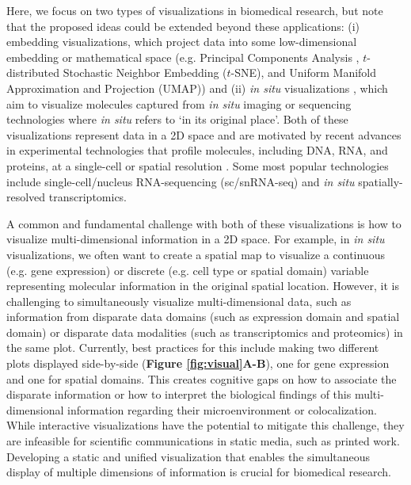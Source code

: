 \documentclass[10pt,twocolumn]{article}
\begin{document}
Here, we focus on two types of visualizations in biomedical research, but note that the proposed ideas could be extended beyond these applications: (i) embedding visualizations, which project data into some low-dimensional embedding or mathematical space (e.g. Principal Components Analysis , $t$-distributed Stochastic Neighbor Embedding ($t$-SNE), and Uniform Manifold Approximation and Projection (UMAP)) and (ii) \textit{in situ} visualizations \cite{dries_2021}, which aim to visualize molecules captured from \textit{in situ} imaging or sequencing technologies where \textit{in situ} refers to `in its original place'. Both of these visualizations represent data in a 2D space and are motivated by recent advances in experimental technologies that profile molecules, including DNA, RNA, and proteins, at a single-cell or spatial resolution%
. Some most popular technologies include single-cell/nucleus RNA-sequencing (sc/snRNA-seq)
and \textit{in situ} spatially-resolved transcriptomics. \cite{vandereyken2023methods} 
% 

A common and fundamental challenge with both of these visualizations is how to visualize multi-dimensional information in a 2D space. For example, in \textit{in situ} visualizations, we often want to create a spatial map to visualize a continuous (e.g. gene expression) or discrete (e.g. cell type or spatial domain) variable representing molecular information in the original spatial location. However, it is challenging to simultaneously visualize multi-dimensional data, such as information from disparate data domains (such as expression domain and spatial domain) or disparate data modalities (such as transcriptomics and proteomics) in the same plot. Currently, best practices for this include making two different plots displayed side-by-side (\textbf{Figure \textbf{\ref{fig:visual}A-B}}), one for gene expression and one for spatial domains. This creates cognitive gaps on how to associate the disparate information or how to interpret the biological findings of this multi-dimensional information regarding their microenvironment or colocalization. While interactive visualizations \cite{keller_2021, pardo_2022, sriworarat_2023} have the potential to mitigate this challenge, they are infeasible for scientific communications in static media, such as printed work. Developing a static and unified visualization that enables the simultaneous display of multiple dimensions of information is crucial for biomedical research.
\end{document}
